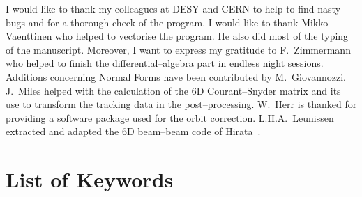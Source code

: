 \documentclass[a4paper,11pt]{report}
\begin{document}
I would like to thank my colleagues at DESY and CERN to help to find
nasty bugs and for a thorough check of the program. I would like to
thank Mikko Vaenttinen who helped to vectorise the program. He also
did most of the typing of the manuscript. Moreover, I want to express
my gratitude to F.~Zimmermann who helped to finish the
differential--algebra part in endless night sessions. Additions
concerning Normal Forms have been contributed by M.~Giovannozzi.
J.~Miles helped with the calculation of the 6D Courant--Snyder matrix
and its use to transform the tracking data in the post--processing.
W.~Herr is thanked for providing a software package used for the orbit
correction. L.H.A.~Leunissen extracted and adapted the 6D beam--beam
code of Hirata~\cite{Hirata}.

\appendix


\chapter{List of Keywords} \label{Lkey}

 \setcounter{kwc}{0}
\end{document}
